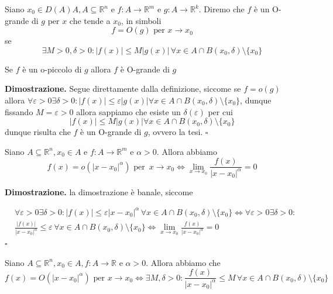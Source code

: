 \vspace{0.5cm}
\begin{definition}[\textcolor{blue}{O-grande}]
Siano $x_0 \in D(A) A, A \subseteq \mathbb{R}^n$ e $f: A \to \mathbb{R}^m$ e $g: A \to \mathbb{R}^k$. Diremo che $f$ è un O-grande di $g$ per $x$ che tende a $x_0$, in simboli
$$
f = O(g) \text{ per } x \to x_0
$$
se $$\exists M > 0, \delta > 0 : |f(x)| \leq M|g(x)| \, \forall x \in A \cap B(x_0, \delta) \setminus \{ x_0 \} $$
\end{definition}

\vspace{0.5cm}
\begin{exercise}
Se $f$ è un o-piccolo di $g$ allora $f$ è O-grande di $g$
\end{exercise}

\noindent \textbf{Dimostrazione. }
Segue direttamente dalla definizione, siccome se $f = o(g)$ allora $\forall \varepsilon > 0 \exists \delta > 0: |f(x)| \leq \varepsilon |g(x)| \forall x \in A \cap B(x_0, \delta) \setminus \{ x_0 \}$, dunque fissando $M = \varepsilon > 0$ allora sappiamo che esiste un $\delta(\varepsilon)$ per cui
$$
|f(x)| \leq M |g(x)| \forall x \in A \cap B(x_0, \delta) \setminus \{ x_0 \}
$$ 
dunque risulta che $f$ è un O-grande di $g$, ovvero la tesi.
\hfill $\square$

\vspace{0.5cm}
\begin{prop}
Siano $A \subseteq \mathbb{R}^n, x_0 \in  A$ e $f: A \to \mathbb{R}^m$ e $\alpha > 0$. Allora abbiamo
$$
f(x) = o(|x-x_0|^\alpha) \text{ per } \, x \to x_0 \iff \lim_{x \to x_0} \frac{f(x)}{|x-x_0|^\alpha} = 0
$$
\end{prop}

\noindent \textbf{Dimostrazione. }
la dimostrazione è banale, siccome 

\[\begin{aligned}
&\forall \varepsilon > 0 \exists \delta > 0: |f(x)| \leq \varepsilon |x-x_0|^\alpha \, \forall x \in A \cap B(x_0, \delta) \setminus \{ x_0 \} \iff \forall \varepsilon > 0 \exists \delta > 0: \\
&\frac{|f(x)|}{|x-x_0|^\alpha} \leq \varepsilon \, \forall x \in A \cap B(x_0, \delta) \setminus \{ x_0 \} \iff \lim_{x \to x_0} \frac{f(x)}{|x-x_0|^\alpha} = 0
\end{aligned}\]
\hfill $\square$

\vspace{0.5cm}
\begin{prop}
Siano $A \subseteq \mathbb{R}^n, x_0 \in A, f: A \to \mathbb{R}$ e $\alpha > 0$. Allora abbiamo che $$f(x) = O(|x-x_0|^\alpha) \text{ per } x \to x_0 \iff \exists M, \delta > 0: \frac{f(x)}{|x-x_0|^\alpha} \leq M \, \forall x \in A \cap B(x_0, \delta) \setminus \{ x_0 \}$$
\end{prop}

